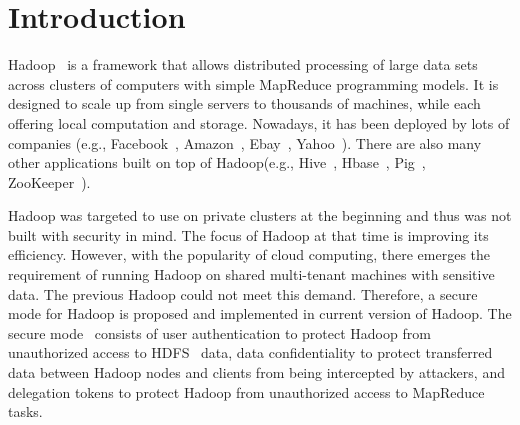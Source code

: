 \section{Introduction}

Hadoop~\cite{hadoop} is a framework that allows distributed processing of large data sets across clusters of computers with simple MapReduce programming models. It is designed to scale up from single servers to thousands of machines, while each offering local computation and storage. Nowadays, it has been deployed by lots of companies (e.g., Facebook~\cite{facebook}, Amazon~\cite{amazon}, Ebay~\cite{ebay}, Yahoo~\cite{yahoo}). There are also many other applications built on top of Hadoop(e.g., Hive~\cite{thusoo2009hive,hive}, Hbase~\cite{hbase}, Pig~\cite{pig}, ZooKeeper~\cite{zookeeper}).

Hadoop was targeted to use on private clusters at the beginning and thus was not built with security in mind. The focus of Hadoop at that time is improving its efficiency. However, with the popularity of cloud computing, there emerges the requirement of running Hadoop on shared multi-tenant machines with sensitive data. The previous Hadoop could not meet this demand. Therefore, a secure mode for Hadoop is proposed and implemented in current version of Hadoop. The secure mode~\cite{securemode} consists of user authentication to protect Hadoop from unauthorized access to HDFS~\cite{shvachko2010hadoop} data, data confidentiality to protect transferred data between Hadoop nodes and clients from being intercepted by attackers, and delegation tokens to protect Hadoop from unauthorized access to MapReduce tasks.

